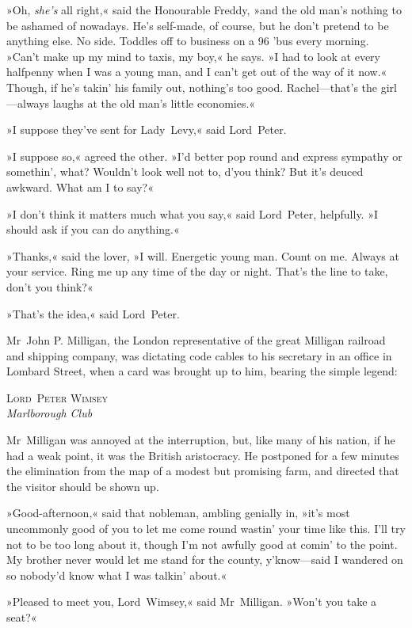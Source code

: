 »Oh, \textit{she's} all right,« said the Honourable Freddy, »and the old man's nothing to be ashamed of nowadays. He's self-made, of course, but he don't pretend to be anything else. No side. Toddles off to business on a 96 'bus every morning. »Can't make up my mind to taxis, my boy,« he says. »I had to look at every halfpenny when I was a young man, and I can't get out of the way of it now.« Though, if he's takin' his family out, nothing's too good. Rachel—that's the girl—always laughs at the old man's little economies.«

»I suppose they've sent for Lady~Levy,« said Lord~Peter.

»I suppose so,« agreed the other. »I'd better pop round and express sympathy or somethin', what? Wouldn't look well not to, d'you think? But it's deuced awkward. What am I to say?«

»I don't think it matters much what you say,« said Lord~Peter, helpfully. »I should ask if you can do anything.«

»Thanks,« said the lover, »I will. Energetic young man. Count on me. Always at your service. Ring me up any time of the day or night. That's the line to take, don't you think?«

»That's the idea,« said Lord~Peter.

Mr~John P. Milligan, the London representative of the great Milligan railroad and shipping company, was dictating code cables to his secretary in an office in Lombard Street, when a card was brought up to him, bearing the simple legend:

\begin{center}
\textsc{Lord~Peter Wimsey}\\
\textit{Marlborough Club}
\end{center}

Mr~Milligan was annoyed at the interruption, but, like many of his nation, if he had a weak point, it was the British aristocracy. He postponed for a few minutes the elimination from the map of a modest but promising farm, and directed that the visitor should be shown up.

»Good-afternoon,« said that nobleman, ambling genially in, »it's most uncommonly good of you to let me come round wastin' your time like this. I'll try not to be too long about it, though I'm not awfully good at comin' to the point. My brother never would let me stand for the county, y'know—said I wandered on so nobody'd know what I was talkin' about.«

»Pleased to meet you, Lord~Wimsey,« said Mr~Milligan. »Won't you take a seat?«

